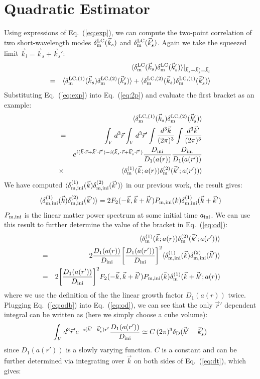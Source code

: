 \documentclass[prd,amsmath,amssymb,floatfix,superscriptaddress,nofootinbib,twocolumn]{revtex4-1}
\def\be{\begin{equation}}
\def\ee{\end{equation}}
\def\bea{\begin{eqnarray}}
\def\eea{\end{eqnarray}}
\newcommand{\LC}{\rm LC}
\newcommand{\ini}{\rm ini}
\newcommand{\vrr}{\vec{r}}
\newcommand{\bk}{{\bar{k}}}
\newcommand{\vs}{\nonumber\\}
\newcommand{\vk}{\vec{k}}
\newcommand{\ec}[1]{Eq.~(\ref{eq:#1})}
\newcommand{\eql}[1]{\label{eq:#1}}
\begin{document}
\section{Quadratic Estimator} \label{sec5}
Using expressions of \ec{exp}, we can compute the two-point correlation of two short-wavelength modes $\delta^{\LC}_{\rm m}(\vk_s)$ and $\delta^{\LC}_{\rm m}(\vk_s')$. Again we take the squeezed limit $\vk_l=\vk_s+\vk_s'$:
\bea 
 &&\langle \delta^{\LC}_{\rm m}(\vk_s)\delta^{\LC}_{\rm m}(\vk_s') \rangle|_{\vk_s+\vk_s'=\vk_l}\vs
 =&&\langle \delta^{\LC,(1)}_{\rm m}(\vk_s)\delta^{\LC,(2)}_{\rm m}(\vk_s') \rangle+\langle \delta^{\LC,(2)}_{\rm m}(\vk_s)\delta^{\LC,(1)}_{\rm m}(\vk_s') \rangle \vs \eql{2p}
\eea 
Substituting \ec{exp} into \ec{2p} and evaluate the first bracket as an example:
\bea 
&&\langle \delta^{\rm LC,(1)}_{\rm m}(\vk_s)\delta^{\rm LC,(2)}_{\rm m}(\vk_s') \rangle \vs 
&=& \int_V d^{3}\vrr\int_{V} d^{3} \vrr' \int \frac{d^{3}\vk}{(2\pi)^3}\int \frac{d^{3}\vk'}{(2\pi)^3}\vs
&& e^{i(\vk\cdot\vrr+\vk'\cdot\vrr')-i(\vk_s\cdot\vrr+\vk_s'\cdot\vrr')} \frac{D_{\ini}}{D_{1}(a(r))} \frac{D_{\ini}}{D_{1}(a(r'))}  \vs
&\times &\langle \delta_{\rm m}^{(1)}(\vk;a(r))\delta_{\rm m}^{(2)}(\vk';a(r')) \rangle \eql{od}
\eea 
We have computed $\langle \delta_{\rm m,ini}^{(1)}(\vk)\delta_{\rm m,ini}^{(2)}(\vk') \rangle$ in our previous work, the result gives:
\be
\langle \delta_{\rm m,ini}^{(1)}(\vk)\delta_{\rm m,ini}^{(2)}(\vk') \rangle =2F_{2}(-\vk,\vk+\vk')P_{\rm m,ini}(k)\delta_{\rm m,ini}^{(1)}(\vk+\vk') 
\ee
$P_{\rm m,ini}$ is the linear matter power spectrum at some initial time $a_{\rm ini}$. We can use this result to further determine the value of the bracket in \ec{od}:
\bea 
&&\langle \delta_{\rm m}^{(1)}(\vk;a(r))\delta_{\rm m}^{(2)}(\vk';a(r')) \rangle \vs
&=&2\frac{D_{1}(a(r))}{D_{\ini}}\bigg[\frac{D_{1}(a(r'))}{D_{\ini}} \bigg]^{2}\langle \delta_{\rm m,ini}^{(1)}(\vk)\delta_{\rm m,ini}^{(2)}(\vk') \rangle  \vs 
&=&2\bigg[\frac{D_{1}(a(r'))}{D_{\ini}} \bigg]^{2}F_{2}(-\vk,\vk+\vk')P_{\rm m,\ini}(\bk)\delta_{\rm m}^{(1)}(\vk+\vk';a(r)) \eql{odb} \vs
\eea 
where we use the definition of the the linear growth factor $D_1(a(r))$ twice. Plugging \ec{odb} into \ec{od}, we can see that the only $\vrr'$ dependent integral can be written as (here we simply choose a cube volume):
\be 
\int_{V} d^{3}\vrr'e^{-i(\vk'-\vk_s')\vrr'}\frac{D_{1}(a(r'))}{D_{\ini}}  \simeq C\,(2\pi)^3\delta_{\rm D}(\vk'-\vk_s')\eql{dt}
\ee 
since $D_1(a(r'))$ is a slowly varying function. $C$ is a constant and can be further determined via integrating over $\vk$ on both sides of \ec{dt}, which gives:
\end{document}

